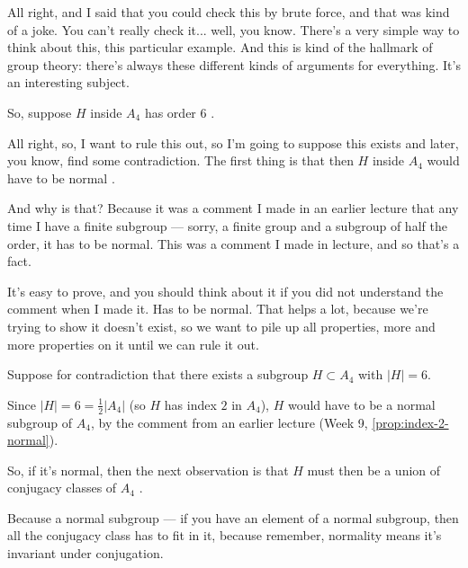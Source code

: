 \begin{proofWrapper}

\begin{speech}[00:16:55 - 00:18:17]
All right, and I said that you could check this by brute force, and that was kind of a joke. You can't really check it... well, you know. There's a very simple way to think about this, this particular example. And this is kind of the hallmark of group theory: there's always these different kinds of arguments for everything. It's an interesting subject.

So, suppose $H$ inside $A_4$ has order $6$ .

All right, so, I want to rule this out, so I'm going to suppose this exists and later, you know, find some contradiction. The first thing is that then $H$ inside $A_4$ would have to be normal .

And why is that? Because it was a comment I made in an earlier lecture that any time I have a finite subgroup --- sorry, a finite group and a subgroup of half the order, it has to be normal. This was a comment I made in lecture, and so that's a fact.

It's easy to prove, and you should think about it if you did not understand the comment when I made it. Has to be normal. That helps a lot, because we're trying to show it doesn't exist, so we want to pile up all properties, more and more properties on it until we can rule it out.
\end{speech}

\begin{content}
Suppose for contradiction that there exists a subgroup $H \subset A_4$ with $|H| = 6$.

Since $|H| = 6 = \frac{1}{2}|A_4|$ (so $H$ has index $2$ in $A_4$), $H$ would have to be a normal subgroup of $A_4$, by the comment from an earlier lecture (Week 9, \cref{prop:index-2-normal}).
\end{content}

\begin{speech}[00:18:17 - 00:18:45]
So, if it's normal, then the next observation is that $H$ must then be a union of conjugacy classes of $A_4$ .

Because a normal subgroup --- if you have an element of a normal subgroup, then all the conjugacy class has to fit in it, because remember, normality means it's invariant under conjugation.
\end{speech}


\end{proofWrapper}
